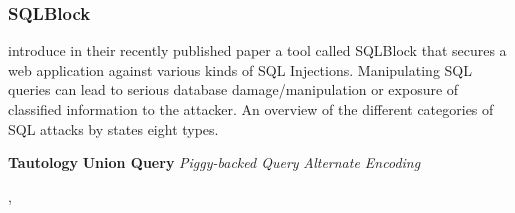 \subsubsection{SQLBlock}
\textcite[]{Jahanshahi2018} introduce in their recently published paper a tool called SQLBlock that secures a web application against various kinds of SQL Injections. Manipulating SQL queries can lead to serious database damage/manipulation or exposure of classified information to the attacker. An overview of the different categories of SQL attacks by \textcite[3ff.]{Halfond2008} states eight types.

\textbf{Tautology} \newline
\textbf{Union Query}\newline
\emph{Piggy-backed Query}
\emph{Alternate Encoding}


\autocite[]{Lam2008}, \autocite[]{Hosek2011} 



